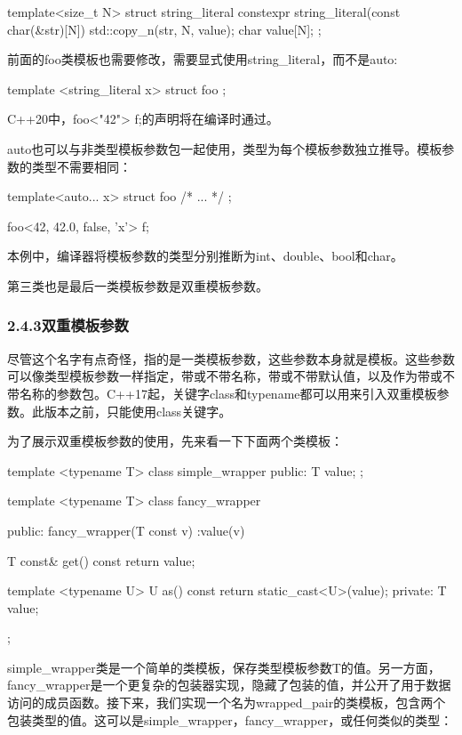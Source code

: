 \begin{cpp}
template<size_t N>
struct string_literal
{
	constexpr string_literal(const char(&str)[N])
	{
		std::copy_n(str, N, value);
	}
	char value[N];
};
\end{cpp}

前面的foo类模板也需要修改，需要显式使用string\_literal，而不是auto:

\begin{cpp}
template <string_literal x>
struct foo
{
};
\end{cpp}

C++20中，foo<"42"> f;的声明将在编译时通过。

auto也可以与非类型模板参数包一起使用，类型为每个模板参数独立推导。模板参数的类型不需要相同：

\begin{cpp}
template<auto... x>
struct foo
{ /* ... */ };

foo<42, 42.0, false, 'x'> f;
\end{cpp}

本例中，编译器将模板参数的类型分别推断为int、double、bool和char。

第三类也是最后一类模板参数是双重模板参数。

\subsubsection{2.4.3\hspace{0.2cm}双重模板参数}

尽管这个名字有点奇怪，指的是一类模板参数，这些参数本身就是模板。这些参数可以像类型模板参数一样指定，带或不带名称，带或不带默认值，以及作为带或不带名称的参数包。C++17起，关键字class和typename都可以用来引入双重模板参数。此版本之前，只能使用class关键字。

为了展示双重模板参数的使用，先来看一下下面两个类模板：

\begin{cpp}
template <typename T>
class simple_wrapper
{
public:
	T value;
};

template <typename T>
class fancy_wrapper
{
public:
	fancy_wrapper(T const v) :value(v)
	{
	}

	T const& get() const { return value; }
	
	template <typename U>
	U as() const
	{
		return static_cast<U>(value);
	}
private:
	T value;
};
\end{cpp}

simple\_wrapper类是一个简单的类模板，保存类型模板参数T的值。另一方面，fancy\_wrapper是一个更复杂的包装器实现，隐藏了包装的值，并公开了用于数据访问的成员函数。接下来，我们实现一个名为wrapped\_pair的类模板，包含两个包装类型的值。这可以是simple\_wrapper，fancy\_wrapper，或任何类似的类型：

